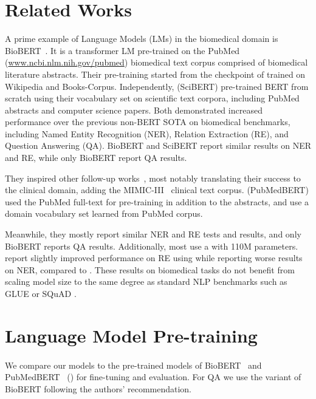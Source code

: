 \documentclass[11pt,a4paper]{article}
\begin{document}
\section{Related Works}

A prime example of Language Models (LMs) in the biomedical domain is BioBERT~\citep{lee2019biobert}. 
It is a transformer LM pre-trained on the PubMed (\url{www.ncbi.nlm.nih.gov/pubmed}) biomedical text corpus comprised of biomedical literature abstracts.
Their pre-training started from the checkpoint of \citet{devlin2018bert} trained on Wikipedia and Books-Corpus.
Independently, \citet{beltagy2019scibert} (SciBERT) pre-trained BERT from scratch using their vocabulary set on scientific text corpora, including PubMed abstracts and computer science papers.
Both demonstrated increased performance over the previous non-BERT SOTA on biomedical benchmarks, including Named Entity Recognition (NER), Relation Extraction (RE), and Question Answering (QA).
BioBERT and SciBERT report similar results on NER and RE, while only BioBERT report QA results.

They inspired other follow-up works~\citep{alsentzer2019publicly, huang2019clinicalbert,peng2019transfer}, most notably translating their success to the clinical domain, adding the MIMIC-III~\citep{johnson2016mimic} clinical text corpus.
\citet{gu2020domain} (PubMedBERT) used the PubMed full-text for pre-training in addition to the abstracts, and use a domain vocabulary set learned from PubMed corpus.

Meanwhile, they mostly report similar NER and RE tests and results, and only BioBERT reports QA results.
Additionally, most use a  with 110M parameters.
\citet{peng2019transfer} report slightly improved performance on RE using  while reporting worse results on NER, compared to .
These results on biomedical tasks do not benefit from scaling model size to the same degree as standard NLP benchmarks such as GLUE or SQuAD \cite{shoeybi2019megatron,T5}.




\section{Language Model Pre-training}

\paragraph{}

We compare our models to the pre-trained  models of BioBERT~\citep{lee2019biobert} and PubMedBERT~\citep{gu2020domain} () for fine-tuning and evaluation.
For QA we use the  variant of BioBERT following the authors' recommendation.
\end{document}
